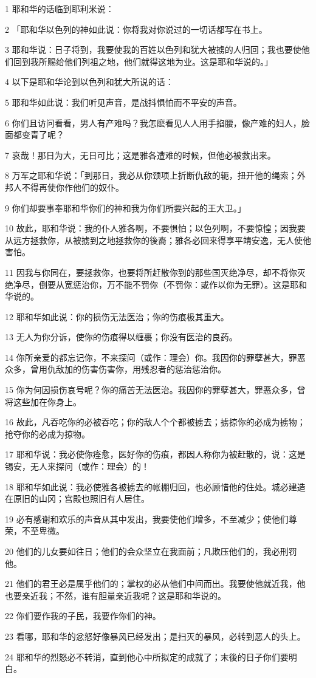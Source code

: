 \par 1 耶和华的话临到耶利米说：
\par 2 「耶和华以色列的神如此说：你将我对你说过的一切话都写在书上。
\par 3 耶和华说：日子将到，我要使我的百姓以色列和犹大被掳的人归回；我也要使他们回到我所赐给他们列祖之地，他们就得这地为业。这是耶和华说的。」
\par 4 以下是耶和华论到以色列和犹大所说的话：
\par 5 耶和华如此说：我们听见声音，是战抖惧怕而不平安的声音。
\par 6 你们且访问看看，男人有产难吗？我怎麽看见人人用手掐腰，像产难的妇人，脸面都变青了呢？
\par 7 哀哉！那日为大，无日可比；这是雅各遭难的时候，但他必被救出来。
\par 8 万军之耶和华说：「到那日，我必从你颈项上折断仇敌的轭，扭开他的绳索；外邦人不得再使你作他们的奴仆。
\par 9 你们却要事奉耶和华你们的神和我为你们所要兴起的王大卫。」
\par 10 故此，耶和华说：我的仆人雅各啊，不要惧怕；以色列啊，不要惊惶；因我要从远方拯救你，从被掳到之地拯救你的後裔；雅各必回来得享平靖安逸，无人使他害怕。
\par 11 因我与你同在，要拯救你，也要将所赶散你到的那些国灭绝净尽，却不将你灭绝净尽，倒要从宽惩治你，万不能不罚你（不罚你：或作以你为无罪）。这是耶和华说的。
\par 12 耶和华如此说：你的损伤无法医治；你的伤痕极其重大。
\par 13 无人为你分诉，使你的伤痕得以缠裹；你没有医治的良药。
\par 14 你所亲爱的都忘记你，不来探问（或作：理会）你。我因你的罪孽甚大，罪恶众多，曾用仇敌加的伤害伤害你，用残忍者的惩治惩治你。
\par 15 你为何因损伤哀号呢？你的痛苦无法医治。我因你的罪孽甚大，罪恶众多，曾将这些加在你身上。
\par 16 故此，凡吞吃你的必被吞吃；你的敌人个个都被掳去；掳掠你的必成为掳物；抢夺你的必成为掠物。
\par 17 耶和华说：我必使你痊愈，医好你的伤痕，都因人称你为被赶散的，说：这是锡安，无人来探问（或作：理会）的！
\par 18 耶和华如此说：我必使雅各被掳去的帐棚归回，也必顾惜他的住处。城必建造在原旧的山冈；宫殿也照旧有人居住。
\par 19 必有感谢和欢乐的声音从其中发出，我要使他们增多，不至减少；使他们尊荣，不至卑微。
\par 20 他们的儿女要如往日；他们的会众坚立在我面前；凡欺压他们的，我必刑罚他。
\par 21 他们的君王必是属乎他们的；掌权的必从他们中间而出。我要使他就近我，他也要亲近我；不然，谁有胆量亲近我呢？这是耶和华说的。
\par 22 你们要作我的子民，我要作你们的神。
\par 23 看哪，耶和华的忿怒好像暴风已经发出；是扫灭的暴风，必转到恶人的头上。
\par 24 耶和华的烈怒必不转消，直到他心中所拟定的成就了；末後的日子你们要明白。

